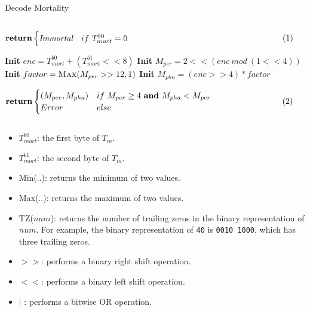 \begin{definition}
    \begin{algorithm}[H]
        \caption[]{\sc Decode Mortality}
        \label{algo-decode-mortality}
        \begin{algorithmic}[1]
            \State $\vcenter{
                \begin{flalign*}
                    \Return & 
                    \begin{cases}
                    \textit{Immortal} & if\ T^{b0}_{mort} = 0
                    \end{cases}&
                \end{flalign*}
            }$
            \Statex 
            \State \textbf{Init} $enc = T^{b0}_{mort} + (T^{b1}_{mort} << 8)$
            \State \textbf{Init} $M_{per} = 2 << (enc\ mod\ (1 << 4))$
            \State \textbf{Init} $factor = \textsc{Max}(M_{per} >> 12, 1)$
            \State \textbf{Init} $M_{pha} = (enc >> 4) * factor$
            \State $\vcenter{
                \begin{flalign*}
                    \Return & 
                    \begin{cases}
                    (M_{per}, M_{pha}) & if\ M_{per} \geq 4\ \textbf{and}\ M_{pha} < M_{per} \\
                    Error & else
                    \end{cases}&
                \end{flalign*}
            }$
        \end{algorithmic}
    \end{algorithm}

    \begin{itemize}
        \item $T^{b0}_{mort}$: the first byte of $T_m$.
        \item $T^{b1}_{mort}$: the second byte of $T_m$.
        \item {\sc Min(..)}: returns the minimum of two values.
        \item {\sc Max(..)}: returns the maximum of two values.
        \item {\sc TZ($num$)}: returns the number of trailing zeros in the
        binary representation of $num$. For example, the binary
        representation of \verb|40| is \verb|0010 1000|, which has three
        trailing zeros.
        \item $>>$: performs a binary right shift operation.
        \item $<<$: performs a binary left shift operation.
        \item $|$ : performs a bitwise OR operation.
    \end{itemize}
\end{definition}

